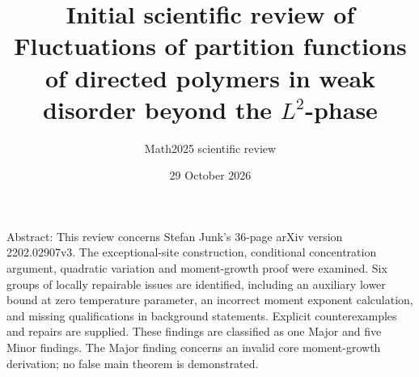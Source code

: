 \documentclass[10pt]{article}
\title{Initial scientific review of
Fluctuations of partition functions of directed polymers
in weak disorder beyond the \(L^2\)-phase}
\author{Math2025 scientific review}
\date{29 October 2026}
\begin{document}
\maketitle
Abstract: This review concerns Stefan Junk’s 36-page arXiv version 2202.02907v3. The exceptional-site construction, conditional concentration argument, quadratic variation and moment-growth proof were examined. Six groups of locally repairable issues are identified, including an auxiliary lower bound at zero temperature parameter, an incorrect moment exponent calculation, and missing qualifications in background statements. Explicit counterexamples and repairs are supplied. These findings are classified as one Major and five Minor findings. The Major finding concerns an invalid core moment-growth derivation; no false main theorem is demonstrated.\par
\end{document}
